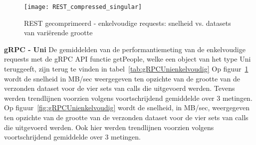 \begin{figure}[ht]
    \centering
    \texttt{[image: REST\_compressed\_singular]}
    \caption{REST gecomprimeerd - enkelvoudige requests: snelheid vs. datasets van vari\"erende grootte}
    \label{fig:RESTcompressieenkelvoudig}
\end{figure}

\textbf{gRPC - Uni}\newline
De gemiddelden van de performantiemeting van de enkelvoudige requests met de gRPC API functie getPeople, welke een object van het type Uni teruggeeft, zijn
terug te vinden in tabel~\ref{tab:gRPCUnienkelvoudig}
Op figuur~\ref{fig:RESTcompressieenkelvoudig} wordt de snelheid in MB/sec weergegeven ten opzichte van de grootte van de verzonden dataset voor de vier sets van
calls die uitgevoerd werden. Tevens werden trendlijnen voorzien volgens voortschrijdend gemiddelde over 3 metingen.\\
Op figuur~\ref{fig:gRPCUnienkelvoudig} wordt de snelheid, in MB/sec, weergegeven ten opzichte van de grootte van de verzonden dataset voor de vier sets van
calls die uitgevoerd werden. Ook hier werden trendlijnen voorzien volgens voortschrijdend gemiddelde over 3 metingen.\\

